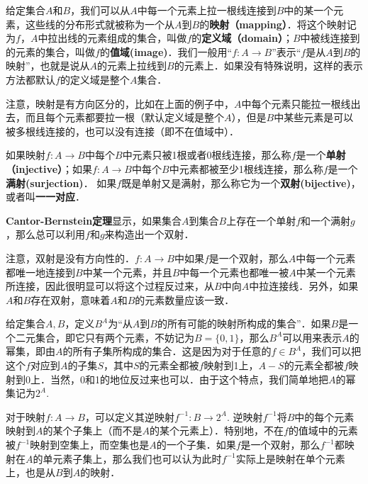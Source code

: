 给定集合$A$和$B$，我们可以从$A$中每一个元素上拉一根线连接到$B$中的某一个元素，这些线的分布形式就被称为一个从$A$到$B$的\textbf{映射（mapping）}．将这个映射记为$f$，$A$中拉出线的元素组成的集合，叫做$f$的\textbf{定义域（domain）}；$B$中被线连接到的元素的集合，叫做$f$的\textbf{值域(image)}．我们一般用“$f:A\rightarrow B$”表示“$f$是从$A$到$B$的映射”，也就是说从$A$的元素上拉线到$B$的元素上．如果没有特殊说明，这样的表示方法都默认$f$的定义域是整个$A$集合．

注意，映射是有方向区分的，比如在上面的例子中，$A$中每个元素只能拉一根线出去，而且每个元素都要拉一根（默认定义域是整个$A$），但是$B$中某些元素是可以被多根线连接的，也可以没有连接（即不在值域中）．

如果映射$f:A\rightarrow B$中每个$B$中元素只被1根或者0根线连接，那么称$f$是一个\textbf{单射（injective）}；如果$f:A\rightarrow B$中每个$B$中元素都被至少1根线连接，那么称$f$是一个\textbf{满射(surjection)}． 如果$f$既是单射又是满射，那么称它为一个\textbf{双射(bijective)}，或者叫\textbf{一一对应}．

\textbf{Cantor-Bernstein定理}显示，如果集合$A$到集合$B$上存在一个单射$f$和一个满射$g$，那么总可以利用$f$和$g$来构造出一个双射．

注意，双射是没有方向性的．$f:A\rightarrow B$中如果$f$是一个双射，那么$A$中每一个元素都唯一地连接到$B$中某一个元素，并且$B$中每一个元素也都唯一被$A$中某一个元素所连接，因此很明显可以将这个过程反过来，从$B$中向$A$中拉连接线．另外，如果$A$和$B$存在双射，意味着$A$和$B$的元素数量应该一致．

给定集合$A, B$，定义$B^A$为“从$A$到$B$的所有可能的映射所构成的集合”．如果$B$是一个二元集合，即它只有两个元素，不妨记为$B=\{0,1\}$，那么$B^A$可以用来表示$A$的幂集，即由$A$的所有子集所构成的集合．这是因为对于任意的$f\in B^A$，我们可以把这个$f$对应到$A$的子集$S$，其中$S$的元素全都被$f$映射到1上，$A-S$的元素全都被$f$映射到0上．当然，0和1的地位反过来也可以．由于这个特点，我们简单地把$A$的幂集记为$2^A$. 

对于映射$f:A\rightarrow B$，可以定义其逆映射$f^{-1}:B\rightarrow 2^A$. 逆映射$f^{-1}$将$B$中的每个元素映射到$A$的某个子集上（而不是$A$的某个元素上）．特别地，不在$f$的值域中的元素被$f^{-1}$映射到空集上，而空集也是$A$的一个子集．如果$f$是一个双射，那么$f^{-1}$都映射在$A$的单元素子集上，那么我们也可以认为此时$f^{-1}$实际上是映射在单个元素上，也是从$B$到$A$的映射．
